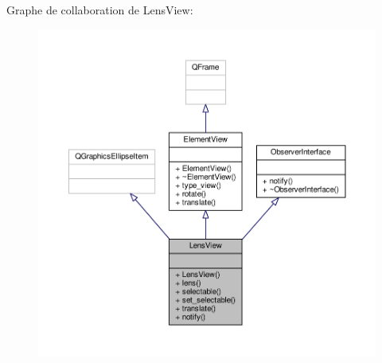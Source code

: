 Graphe de collaboration de Lens\+View\+:
\nopagebreak
\begin{figure}[H]
\begin{center}
\leavevmode
\includegraphics[width=350pt]{d3/d32/classLensView__coll__graph}
\end{center}
\end{figure}
